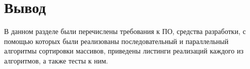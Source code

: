 \section*{Вывод}
В данном разделе были перечислены требования к ПО, средства разработки, с помощью которых были реализованы последовательный и параллельный алгоритмы сортировки массивов, приведены листинги реализаций каждого из алгоритмов, а также тесты к ним.


